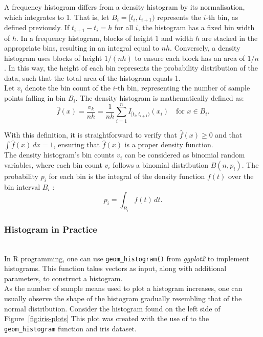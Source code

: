 \documentclass{article}\usepackage[]{graphicx}\usepackage[]{xcolor}
\numberwithin{equation}{section}
\begin{document}
\noindent A frequency histogram differs from a density histogram by its normalisation, which integrates to 1. That is, let $B_i = [t_i,t_{i+1})$ represents the $i$-th bin, as defined previously. If $t_{i+1} − t_i = h$ for all $i$, the histogram has a fixed bin width of $h$. In a frequency histogram, blocks of height $1$ and width $h$ are stacked in the appropriate bins, resulting in an integral equal to $nh$. Conversely, a density histogram uses blocks of height $1/(nh)$ to ensure each block has an area of $1/n$ \cite{scott2015multivariate}. In this way, the height of each bin represents the probability distribution of the data, such that the total area of the histogram equals 1.\\

\noindent Let $v_i$ denote the bin count of the $i$-th bin, representing the number of sample points falling in bin $B_i$. The density histogram is mathematically defined as:
\[ \hat{f}(x) = \frac{v_k}{nh} = \frac{1}{nh} \sum_{i=1}^{n} I_{[t_i,t_{i+1})}(x_i) \quad \text{for } x \in B_i.\]

\noindent With this definition, it is straightforward to verify that $ \hat{f}(x) \geq 0 $ and that $ \int \hat{f}(x) \, dx = 1 $, ensuring that $ \hat{f}(x) $ is a proper density function.\\

\noindent
The density histogram's bin counts ${v_{i}}$ can be considered as binomial random variables, where each bin count $v_{i}$ follows a binomial distribution $B(n,p_{i})$. The probability $p_{i}$ for each bin is the integral of the density function $f(t)$ over the bin interval $B_{i}$ \cite{scott2015multivariate}:
$$p_{i} = \int_{B_i} f(t) \, dt. $$

\subsubsection{Histogram in Practice}\\

\noindent In R programming, one can use \texttt{geom\_histogram()} from \textit{ggplot2} to implement histograms. This function takes vectors as input, along with additional parameters, to construct a histogram.\\

\noindent As the number of sample means used to plot a histogram increases, one can usually observe the shape of the histogram gradually resembling that of the normal distribution. Consider the histogram found on the left side of Figure~\ref{fig:iris-plots} This plot was created with the use of to the \texttt{geom\_histogram} function and iris dataset.\\
\end{document}
